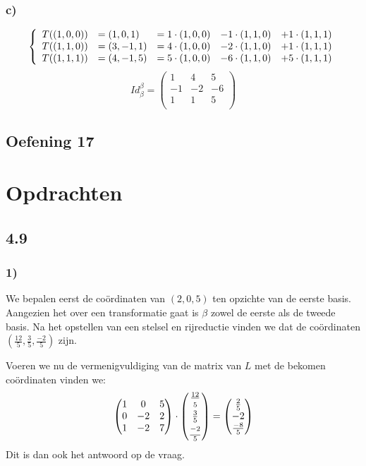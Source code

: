 \documentclass[lineaire_algebra_oplossingen.tex]{subfiles}
\begin{document}
\subsubsection*{c)}
\[
\left\lbrace
\begin{array}{c l c c c}
T((1,0,0)) &= (1,0,1) &= 1\cdot (1,0,0) &- 1\cdot (1,1,0) &+ 1\cdot (1,1,1)\\
T((1,1,0)) &= (3,-1,1)&= 4\cdot (1,0,0) &- 2\cdot (1,1,0) &+ 1\cdot (1,1,1)\\
T((1,1,1)) &= (4,-1,5)&= 5\cdot (1,0,0) &- 6\cdot (1,1,0) &+ 5\cdot (1,1,1)\\
\end{array}
\right.
\]
\[
Id_\beta^\beta = 
\begin{pmatrix}
1 & 4 & 5\\
-1 & -2 & -6\\
1 & 1 & 5\\
\end{pmatrix}
\]

\subsection{Oefening 17}


\section{Opdrachten}

\subsection{4.9}
\subsubsection*{1)}
We bepalen eerst de co\"ordinaten van $(2,0,5)$ ten opzichte van de eerste basis. Aangezien het over een transformatie gaat is $\beta$ zowel de eerste als de tweede basis. 
Na het opstellen van een stelsel en rijreductie vinden we dat de co\"ordinaten $\left(\frac{12}{5},\frac{3}{5},\frac{-2}{5}\right)$ zijn.

Voeren we nu de vermenigvuldiging van de matrix van $L$ met de bekomen co\"ordinaten vinden we:\\
$$
\begin{pmatrix}
1&0&5\\
0&-2&2\\
1&-2&7
\end{pmatrix}
\cdot
\begin{pmatrix}
\frac{12}{\strut5}\\ \frac{3}{5}\\ \frac{\strut -2}{5}
\end{pmatrix}
=
\begin{pmatrix}
\strut \frac{2}{5}\\ -2\\ \strut \frac{-8}{5}
\end{pmatrix}
$$
Dit is dan ook het antwoord op de vraag.
\end{document}
